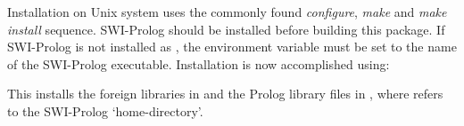 \documentclass[11pt]{article}
\begin{document}
Installation on Unix system uses the commonly found {\em configure},
{\em make} and {\em make install} sequence. SWI-Prolog should be
installed before building this package. If SWI-Prolog is not installed
as , the environment variable  must be set to the
name of the SWI-Prolog executable. Installation is now accomplished
using:

\begin{code}
\end{code}

\noindent
This installs the foreign libraries in  and
the Prolog library files in , where
 refers to the SWI-Prolog `home-directory'.
\end{document}
